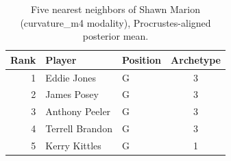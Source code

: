 \begin{table}[htbp]
  \centering\small
  \begin{tabular}{rllc}
    \toprule
    Rank & Player & Position & Archetype \\
    \midrule
    1 & Eddie Jones & G & 3 \\
    2 & James Posey & G & 3 \\
    3 & Anthony Peeler & G & 3 \\
    4 & Terrell Brandon & G & 3 \\
    5 & Kerry Kittles & G & 1 \\
    \bottomrule
  \end{tabular}
  \caption{Five nearest neighbors of Shawn Marion (curvature_m4 modality), Procrustes-aligned posterior mean.}
  \label{tab:Shawn_Marion_neighbors_curvature_m4}
\end{table}

